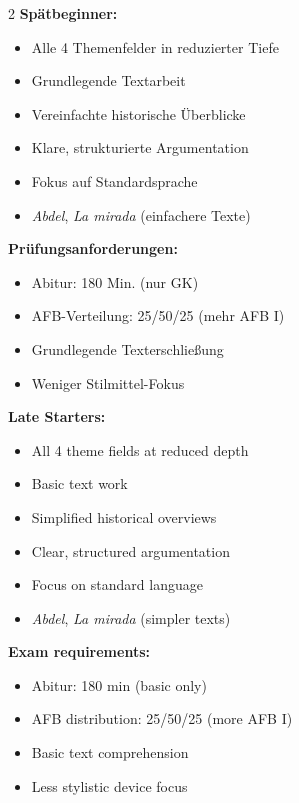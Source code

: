 \documentclass[10pt,a4paper]{article}
\begin{document}
\vspace{3mm}

\begin{paracol}{2}
\small
\textbf{Spätbeginner:}
\begin{itemize}[noitemsep,topsep=2pt]
\item Alle 4 Themenfelder in reduzierter Tiefe
\item Grundlegende Textarbeit
\item Vereinfachte historische Überblicke
\item Klare, strukturierte Argumentation
\item Fokus auf Standardsprache
\item \textit{Abdel}, \textit{La mirada} (einfachere Texte)
\end{itemize}

\textbf{Prüfungsanforderungen:}
\begin{itemize}[noitemsep,topsep=2pt]
\item Abitur: 180 Min. (nur GK)
\item AFB-Verteilung: 25/50/25 (mehr AFB I)
\item Grundlegende Texterschließung
\item Weniger Stilmittel-Fokus
\end{itemize}

\switchcolumn

\small\color{english}
\textbf{Late Starters:}
\begin{itemize}[noitemsep,topsep=2pt]
\item All 4 theme fields at reduced depth
\item Basic text work
\item Simplified historical overviews
\item Clear, structured argumentation
\item Focus on standard language
\item \textit{Abdel}, \textit{La mirada} (simpler texts)
\end{itemize}

\textbf{Exam requirements:}
\begin{itemize}[noitemsep,topsep=2pt]
\item Abitur: 180 min (basic only)
\item AFB distribution: 25/50/25 (more AFB I)
\item Basic text comprehension
\item Less stylistic device focus
\end{itemize}

\end{paracol}
\end{document}
